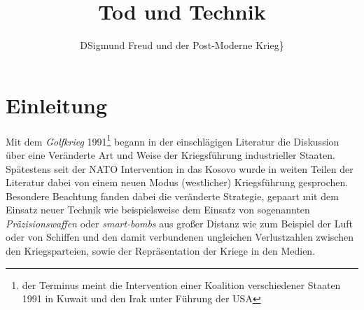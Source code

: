 \documentclass[11pt,a4paper,oneside,numbers=noenddot,bibliography=totocnumbered,DIV=13]{scrartcl}
\begin{document}
\titlehead{Freie Universität Berlin \hfill Autor: Jan Opper\\
Otto-Suhr Institut für Politikwissenschaft\hfill Mat.-Nr.: 4655381\\
SE: Geburt der Moderne oder Zeugung der Post-Moderne\hfill {E-Mail: Opperj@zedat.fu-berlin.de}\\
Leitung: Gerd Harders\hfill 15.10.2014\\
Sommersemester 2014\\} 
\title{\large Tod und Technik} 
\subtitle{\small DSigmund Freud und der Post-Moderne Krieg\}}
\maketitle
\newpage
\tableofcontents
\newpage
\section{Einleitung}
Mit dem \textit{Golfkrieg} 1991\footnote{der Terminus meint die Intervention einer Koalition verschiedener Staaten 1991 in Kuwait und den Irak unter Führung der USA} begann in der einschlägigen Literatur die Diskussion über eine Veränderte Art und Weise der Kriegsführung industrieller Staaten. Spätestens seit der NATO Intervention in das Kosovo wurde in weiten Teilen der Literatur dabei von einem neuen Modus (westlicher) Kriegsführung gesprochen. Besondere Beachtung fanden dabei die veränderte Strategie, gepaart mit dem Einsatz neuer Technik wie beispielsweise dem Einsatz von sogenannten \textit{Präzisionswaffen} oder \textit{smart-bombs} aus großer Distanz wie zum Beispiel der Luft oder von Schiffen und den damit verbundenen ungleichen Verlustzahlen zwischen den Kriegsparteien, sowie der Repräsentation der Kriege in den Medien. 
\newpage
\end{document}
